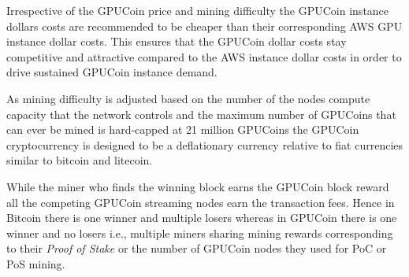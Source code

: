 Irrespective of the GPUCoin price and mining difficulty the GPUCoin instance dollars costs are recommended to be cheaper than their corresponding AWS GPU instance dollar costs. This ensures that the GPUCoin dollar costs stay competitive and attractive compared to the AWS instance dollar costs in order to drive sustained GPUCoin instance demand.

As mining difficulty is adjusted based on the number of the nodes compute capacity that the network controls and the maximum number of GPUCoins that can ever be mined is hard-capped at 21 million GPUCoins the GPUCoin cryptocurrency is designed to be a deflationary currency relative to fiat currencies similar to bitcoin and litecoin.

While the miner who finds the winning block earns the GPUCoin block reward all the competing GPUCoin streaming nodes earn the transaction fees. Hence in Bitcoin there is one winner and multiple losers whereas in GPUCoin there is one winner and no losers i.e., multiple miners sharing mining rewards corresponding to their \emph{Proof of Stake} or the number of GPUCoin nodes they used for PoC or PoS mining.
